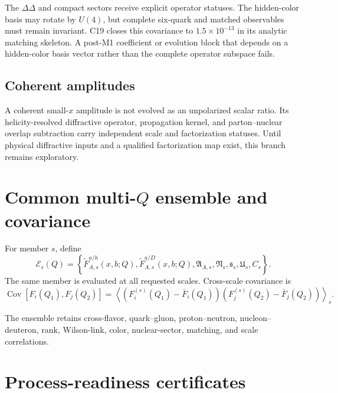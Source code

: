\documentclass[11pt]{article}
\newcommand{\cE}{\mathcal E}
\newcommand{\avg}[1]{\left\langle #1\right\rangle}
\begin{document}
The \(\Delta\Delta\) and compact sectors receive explicit operator statuses.  The hidden-color basis may rotate by \(U(4)\), but complete six-quark and matched observables must remain invariant.  C19 closes this covariance to \(1.5\times10^{-13}\) in its analytic matching skeleton.  A post-M1 coefficient or evolution block that depends on a hidden-color basis vector rather than the complete operator subspace fails.

\subsection{Coherent amplitudes}

A coherent small-\(x\) amplitude is not evolved as an unpolarized scalar ratio.  Its helicity-resolved diffractive operator, propagation kernel, and parton--nuclear overlap subtraction carry independent scale and factorization statuses.  Until physical diffractive inputs and a qualified factorization map exist, this branch remains exploratory.

\section{Common multi-\texorpdfstring{\(Q\)}{Q} ensemble and covariance}
\label{sec:ensemble}

For member \(s\), define
\begin{equation}
 \cE_s(Q)=
 \left
 \{
 \widetilde F_{A,s}^{a/h}(x,b;Q),
 \widetilde F_{A,s}^{a/D}(x,b;Q),
 \mathfrak A_{A,s},
 \mathfrak N_s,
 \mathfrak s_s,
 \mathfrak U_s,
 C_s
 \right\}.
 \label{eq:multiQ-member}
\end{equation}
The same member is evaluated at all requested scales.  Cross-scale covariance is
\begin{equation}
 \operatorname{Cov}
 \left[F_i(Q_1),F_j(Q_2)\right]
 =
 \avg{
 \left(F_i^{(s)}(Q_1)-\bar F_i(Q_1)\right)
 \left(F_j^{(s)}(Q_2)-\bar F_j(Q_2)\right)
 }_s.
 \label{eq:cross-scale-covariance}
\end{equation}

The ensemble retains cross-flavor, quark--gluon, proton--neutron, nucleon--deuteron, rank, Wilson-link, color, nuclear-sector, matching, and scale correlations.

\section{Process-readiness certificates}
\label{sec:process-readiness}
\end{document}
